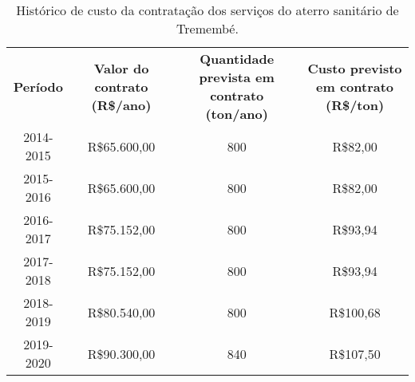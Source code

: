 \begin{table}[htbp]
  \centering
  \caption{Histórico de custo da contratação dos serviços do aterro sanitário de Tremembé.}
    \begin{tabular}{cccc}
	\rowcolor[rgb]{ .969,  .588,  .275} \textcolor[rgb]{ 1,  1,  1}{\textbf{Período}} & \multicolumn{1}{p{8em}}{\textcolor[rgb]{ 1,  1,  1}{\textbf{Valor do contrato (R\$/ano)}}} & \multicolumn{1}{p{8.59em}}{\textcolor[rgb]{ 1,  1,  1}{\textbf{Quantidade prevista em contrato (ton/ano)}}} & \multicolumn{1}{p{8.225em}}{\textcolor[rgb]{ 1,  1,  1}{\textbf{Custo previsto em contrato (R\$/ton)}}} \\
	\rowcolor[rgb]{ .992,  .914,  .851} 2014-2015 & R\$65.600,00 & 800   & R\$82,00 \\
	\rowcolor[rgb]{ .984,  .831,  .706} 2015-2016 & R\$65.600,00 & 800   & R\$82,00 \\
	\rowcolor[rgb]{ .992,  .914,  .851} 2016-2017 & R\$75.152,00 & 800   & R\$93,94 \\
	\rowcolor[rgb]{ .984,  .831,  .706} 2017-2018 & R\$75.152,00 & 800   & R\$93,94 \\
	\rowcolor[rgb]{ .992,  .914,  .851} 2018-2019 & R\$80.540,00 & 800   & R\$100,68 \\
	\rowcolor[rgb]{ .984,  .831,  .706} 2019-2020 & R\$90.300,00 & 840   & R\$107,50 \\
\end{tabular}%
  \label{tab:custos_contrato}%
\end{table}%
